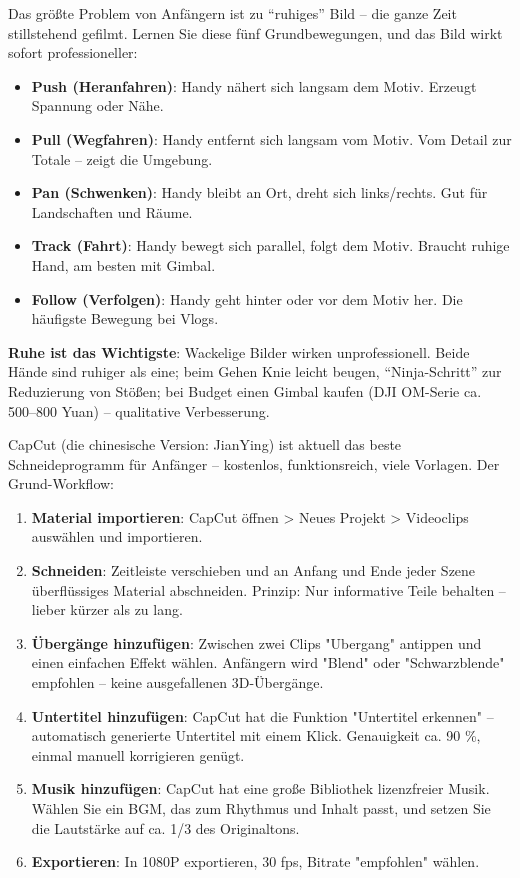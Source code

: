
Das größte Problem von Anfängern ist zu “ruhiges” Bild – die ganze Zeit stillstehend gefilmt. Lernen Sie diese fünf Grundbewegungen, und das Bild wirkt sofort professioneller:

\begin{itemize}
  \item \textbf{Push (Heranfahren)}: Handy nähert sich langsam dem Motiv. Erzeugt Spannung oder Nähe.
  \item \textbf{Pull (Wegfahren)}: Handy entfernt sich langsam vom Motiv. Vom Detail zur Totale – zeigt die Umgebung.
  \item \textbf{Pan (Schwenken)}: Handy bleibt an Ort, dreht sich links/rechts. Gut für Landschaften und Räume.
  \item \textbf{Track (Fahrt)}: Handy bewegt sich parallel, folgt dem Motiv. Braucht ruhige Hand, am besten mit Gimbal.
  \item \textbf{Follow (Verfolgen)}: Handy geht hinter oder vor dem Motiv her. Die häufigste Bewegung bei Vlogs.
\end{itemize}

\textbf{Ruhe ist das Wichtigste}: Wackelige Bilder wirken unprofessionell. Beide Hände sind ruhiger als eine; beim Gehen Knie leicht beugen, “Ninja-Schritt” zur Reduzierung von Stößen; bei Budget einen Gimbal kaufen (DJI OM-Serie ca. 500–800 Yuan) – qualitative Verbesserung.


CapCut (die chinesische Version: JianYing) ist aktuell das beste Schneideprogramm für Anfänger – kostenlos, funktionsreich, viele Vorlagen. Der Grund-Workflow:

\begin{enumerate}
  \item \textbf{Material importieren}: CapCut öffnen > Neues Projekt > Videoclips auswählen und importieren.
  \item \textbf{Schneiden}: Zeitleiste verschieben und an Anfang und Ende jeder Szene überflüssiges Material abschneiden. Prinzip: Nur informative Teile behalten – lieber kürzer als zu lang.
  \item \textbf{Übergänge hinzufügen}: Zwischen zwei Clips "Ubergang" antippen und einen einfachen Effekt wählen. Anfängern wird "Blend" oder "Schwarzblende" empfohlen – keine ausgefallenen 3D-Übergänge.
  \item \textbf{Untertitel hinzufügen}: CapCut hat die Funktion "Untertitel erkennen" – automatisch generierte Untertitel mit einem Klick. Genauigkeit ca. 90 \%, einmal manuell korrigieren genügt.
  \item \textbf{Musik hinzufügen}: CapCut hat eine große Bibliothek lizenzfreier Musik. Wählen Sie ein BGM, das zum Rhythmus und Inhalt passt, und setzen Sie die Lautstärke auf ca. 1/3 des Originaltons.
  \item \textbf{Exportieren}: In 1080P exportieren, 30 fps, Bitrate "empfohlen" wählen.
\end{enumerate}

